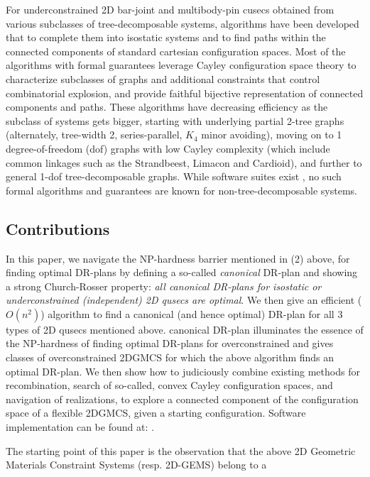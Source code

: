  
\medskip\noindent{}
For underconstrained 2D bar-joint and multibody-pin cusecs obtained from various subclasses of tree-decomposable systems, algorithms have been developed \cite{XX, XX} that 
to complete them into isostatic systems \cite{XX, XX} and to find paths within the connected components \cite{XX,XX} of
standard cartesian configuration spaces. Most of the algorithms with formal guarantees leverage Cayley configuration space theory \cite{XX,XX}
to characterize subclasses of graphs and additional constraints that control combinatorial explosion, and provide faithful bijective representation 
of connected components and paths.
These algorithms have decreasing efficiency as the subclass of systems gets bigger, starting with
underlying partial 2-tree graphs (alternately, tree-width 2, series-parallel, $K_4$ minor avoiding),  moving on   
to 1 degree-of-freedom (dof) graphs with low Cayley complexity (which include common linkages such as the Strandbeest, Limacon and Cardioid), 
and further to general 1-dof tree-decomposable graphs. 
While software suites exist \cite{XX,XX}, no such formal algorithms and guarantees are known for non-tree-decomposable systems.


\subsection{Contributions}
\label{sec:cont}
In this paper, we  navigate the NP-hardness barrier mentioned in (2) above, for finding optimal DR-plans by defining a 
so-called {\it canonical} DR-plan and showing a strong Church-Rosser property: {\it all canonical DR-plans for isostatic or underconstrained (independent) 
2D qusecs are optimal}. 
We then give an efficient ($O(n^2)$) algorithm to find a canonical (and hence optimal) DR-plan for all 3 types of 2D qusecs mentioned above.
canonical DR-plan 
illuminates the essence of the NP-hardness of finding optimal DR-plans for overconstrained  and gives classes of 
overconstrained 2DGMCS for which the above  algorithm finds an optimal DR-plan. We then show how to judiciously combine 
existing methods for recombination, search of so-called, convex Cayley configuration spaces, and navigation of realizations, 
to explore a connected component of the configuration space of a flexible 2DGMCS, given a starting configuration. 
Software implementation can be found at: .

The starting point of this paper is the observation that the above 2D Geometric Materials Constraint Systems (resp. 2D-GEMS) 
belong to a  

